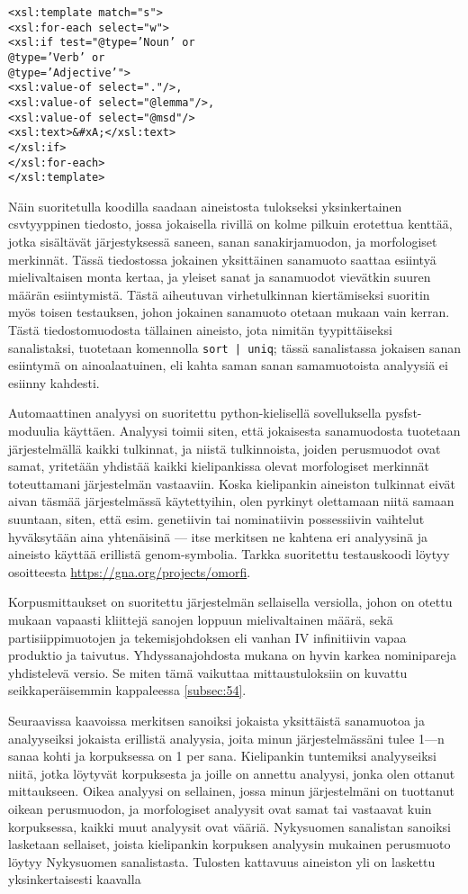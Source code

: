 \documentclass[free]{flammie}
\begin{document}
\begin{verbatim}
<xsl:template match="s">
<xsl:for-each select="w">
<xsl:if test="@type=’Noun’ or
@type=’Verb’ or
@type=’Adjective’">
<xsl:value-of select="."/>,
<xsl:value-of select="@lemma"/>,
<xsl:value-of select="@msd"/>
<xsl:text>&#xA;</xsl:text>
</xsl:if>
</xsl:for-each>
</xsl:template>
\end{verbatim}

Näin suoritetulla koodilla saadaan aineistosta tulokseksi yksinkertainen csvtyyppinen tiedosto, jossa jokaisella rivillä on kolme pilkuin erotettua kenttää, jotka sisältävät järjestyksessä saneen, sanan sanakirjamuodon, ja morfologiset merkinnät. Tässä tiedostossa jokainen yksittäinen sanamuoto saattaa esiintyä mielivaltaisen monta kertaa, ja yleiset sanat ja sanamuodot vievätkin suuren määrän
esiintymistä. Tästä aiheutuvan virhetulkinnan kiertämiseksi suoritin myös toisen
testauksen, johon jokainen sanamuoto otetaan mukaan vain kerran. Tästä tiedostomuodosta tällainen aineisto, jota nimitän tyypittäiseksi sanalistaksi, tuotetaan
komennolla \texttt{sort | uniq}; tässä sanalistassa jokaisen sanan esiintymä on ainoalaatuinen, eli kahta saman sanan samamuotoista analyysiä ei esiinny kahdesti.

Automaattinen analyysi on suoritettu python-kielisellä sovelluksella pysfst-moduulia käyttäen. Analyysi toimii siten, että jokaisesta sanamuodosta tuotetaan
järjestelmällä kaikki tulkinnat, ja niistä tulkinnoista, joiden perusmuodot ovat samat, yritetään yhdistää kaikki kielipankissa olevat morfologiset merkinnät toteuttamani järjestelmän vastaaviin. Koska kielipankin aineiston tulkinnat eivät aivan
täsmää järjestelmässä käytettyihin, olen pyrkinyt olettamaan niitä samaan suuntaan, siten, että esim. genetiivin tai nominatiivin possessiivin vaihtelut hyväksytään aina yhtenäisinä — itse merkitsen ne kahtena eri analyysinä ja aineisto
käyttää erillistä genom-symbolia. Tarkka suoritettu testauskoodi löytyy
osoitteesta \url{https://gna.org/projects/omorfi}.

Korpusmittaukset on suoritettu järjestelmän sellaisella versiolla, johon on otettu
mukaan vapaasti kliittejä sanojen loppuun mielivaltainen määrä, sekä partisiippimuotojen ja tekemisjohdoksen eli vanhan IV infinitiivin vapaa produktio ja taivutus. Yhdyssanajohdosta mukana on hyvin karkea nominipareja yhdistelevä versio.
Se miten tämä vaikuttaa mittaustuloksiin on kuvattu seikkaperäisemmin
kappaleessa \ref{subsec:54}.

Seuraavissa kaavoissa merkitsen sanoiksi jokaista yksittäistä sanamuotoa ja analyyseiksi jokaista erillistä analyysia, joita minun järjestelmässäni tulee 1—n sanaa
kohti ja korpuksessa on 1 per sana. Kielipankin tuntemiksi analyyseiksi niitä, jotka löytyvät korpuksesta ja joille on annettu analyysi, jonka olen ottanut mittaukseen. Oikea analyysi on sellainen, jossa minun järjestelmäni on tuottanut oikean
perusmuodon, ja morfologiset analyysit ovat samat tai vastaavat kuin korpuksessa, kaikki muut analyysit ovat vääriä. Nykysuomen sanalistan sanoiksi lasketaan
sellaiset, joista kielipankin korpuksen analyysin mukainen perusmuoto löytyy Nykysuomen sanalistasta.
Tulosten kattavuus aineiston yli on laskettu yksinkertaisesti kaavalla
\end{document}
